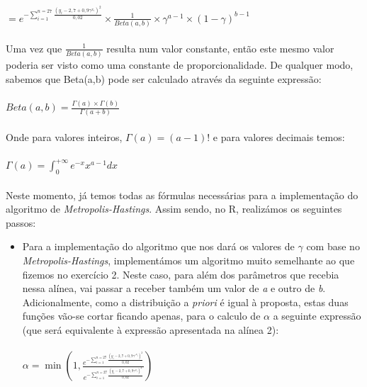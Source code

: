 \documentclass{article}
\begin{document}
				\paragraph{}
				\centerline{$= e^{- \sum_{i=1}^{n=27} \frac{{(y_{i}-2,7+0,9\gamma^{x_i})}^2}{0,02}}   \times    \frac{1}{Beta(a,b)}   \times   \gamma^{a-1}   \times   (1-\gamma)^{b-1}    $}


				\paragraph{}
				Uma vez que $\frac{1}{Beta(a,b)}$ resulta num valor constante, então este mesmo valor poderia ser visto como uma constante de proporcionalidade. De qualquer modo, sabemos que Beta(a,b) pode ser calculado através da seguinte expressão:

				\paragraph{}
				\centerline{$ Beta(a,b) = \frac{\Gamma(a) \times \Gamma(b)}{\Gamma(a+b)} $}
				\paragraph{}
				Onde para valores inteiros, $\Gamma(a) = (a-1)!$ e para valores decimais temos:\\				

				\paragraph{}
				 \centerline{$ \Gamma(a) = \int_{0}^{+\infty} e^{-x}x^{a-1}dx $}

				\paragraph{}
				Neste momento, já temos todas as fórmulas necessárias para a implementação do algoritmo de \textit{Metropolis-Hastings}. Assim sendo, no R, realizámos os seguintes passos:

					\begin{itemize}
					\item Para a implementação do algoritmo que nos dará os valores de $\gamma$ com base no \textit{Metropolis-Hastings}, implementámos um algoritmo muito semelhante ao que fizemos no exercício 2. Neste caso, para além dos parâmetros que recebia nessa alínea, vai passar a receber também um valor de \textit{a} e outro de \textit{b}. Adicionalmente, como a distribuição a  \textit{priori} é igual à proposta, estas duas funções vão-se cortar ficando apenas, para o calculo de $\alpha$ a seguinte expressão (que será equivalente à expressão apresentada na alínea 2):

					\paragraph{}
					\centerline{$\alpha = \min  \left(1,   \frac{   e^{- \sum_{i=1}^{n=27} \frac{{(y_{i}-2,7+0,9\gamma'^{x_i})}^2}{0,02}}        }{e^{- \sum_{i=1}^{n=27} \frac{{(y_{i}-2,7+0,9\gamma^{x_i})}^2}{0,02}}} \right)  $ }

					\end{itemize}
\end{document}

